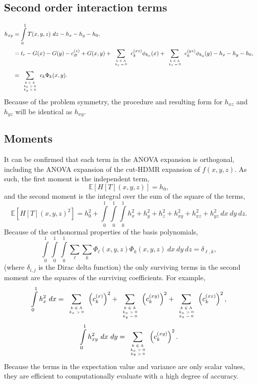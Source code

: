 \documentclass[11pt]{article}
\newcommand{\expv}[1]{\ensuremath{\mathbb{E}[ #1]}}
\newcommand{\intz}{\ensuremath{\int\limits_0^1}}
\newcommand{\mlsum}[2]{\ensuremath{\sum_{\tiny\begin{array}{c}#1\end{array}}^{#2}}}
\begin{document}
\subsection{Second order interaction terms}
\begin{align}
  h_{xy} &= \intz T(x,y,z)\ dz - h_x - h_y - h_0,\\
    &= t_r - G(x) - G(y) - c^{(z)}_\varnothing + G(x,y) + \mlsum{k\in\Lambda\\k_z=0}{} c^{(xz)}_k\phi_{k_x}(x)
    + \mlsum{k\in\Lambda\\k_z=0}{} c^{(yz)}_k\phi_{k_y}(y) - h_x - h_y - h_0, \\
  &= \mlsum{k\in\Lambda\\k_x>0\\k_y>0}{} c_k \Phi_k(x,y).
\end{align}
Because of the problem symmetry, the procedure and resulting form for $h_{xz}$ and $h_{yz}$ will be identical
as $h_{xy}$.

\subsection{Moments}
It can be confirmed that each term in the ANOVA expansion is orthogonal, including the ANOVA expansion of the
cut-HDMR expansion of $f(x,y,z)$.  As such, the first moment is the independent term,
\begin{equation}
  \expv{H[T](x,y,z)} = h_0,
\end{equation}
and the second moment is the integral over the sum of the square of the terms,
\begin{equation}
  \expv{H[T](x,y,z)^2} = h_0^2 + \intz\intz\intz h_x^2 + h_y^2 + h_z^2 + h_{xy}^2 + h_{xz}^2 + h_{yz}^2\ dx\
  dy\ dz.
\end{equation}
Because of the orthonormal properties of the basis polynomials,
\begin{equation}
  \intz\intz\intz \sum_{\ell}\sum_k\Phi_\ell(x,y,z)\Phi_k(x,y,z)\ dx\ dy\ dz = \delta_{\ell,k},
\end{equation}
(where $\delta_{i,j}$ is the Dirac delta function) the only surviving terms in the second moment are the
squares of the surviving coefficients.  For example,
\begin{equation}
  \intz h_x^2\ dx = \mlsum{k\in\Lambda\\k_x>0}{}\left(c_k^{(x)}\right)^2 +
    \mlsum{k\in\Lambda\\k_x>0\\k_y=0}{} \left(c_k^{(xy)}\right)^2 + \mlsum{k\in\Lambda\\k_x>0\\k_z=0}{}
    \left(c_k^{(xz)}\right)^2,
\end{equation}
\begin{equation}
  \intz h_{xy}^2\ dx\ dy = \mlsum{k\in\Lambda\\k_x>0\\ky>0}{}\left(c_k^{(xy)}\right)^2.
\end{equation}
Because the terms in the expectation value and variance are only scalar values, they are efficient to
computationally evaluate with a high degree of accuracy.
\end{document}
